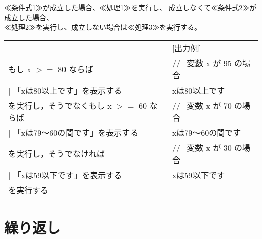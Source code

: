 \documentclass[11pt,a4j]{jarticle}
\begin{document}
≪条件式1≫が成立した場合、≪処理1≫を実行し、
成立しなくて≪条件式2≫が成立した場合、\\
≪処理2≫を実行し、成立しない場合は≪処理3≫を実行する。

\begin{table}[!h]
\hspace{1cm}
\begin{tabular}{l l}
\noindent [使用例] & \hspace{1cm} [出力例] \\
\hspace{1cm} \noindent もし x $>=$ 80 ならば & 
\hspace{2cm} // \ 変数 x が 95 の場合 \\
\hspace{1cm}   \hspace{1zw} $|$ \hspace{1zw}  「xは80以上です」を表示する & 
\hspace{2cm} xは80以上です \\
\hspace{1cm} を実行し，そうでなくもし x $>=$ 60 ならば & 
\hspace{2cm} // \ 変数 x が 70 の場合 \\
\hspace{1cm}   \hspace{1zw} $|$ \hspace{1zw}  「xは79〜60の間です」を表示する & 
\hspace{2cm} xは79〜60の間です \\
\hspace{1cm} を実行し，そうでなければ & 
\hspace{2cm} // \ 変数 x が 30 の場合 \\
\hspace{1cm}   \hspace{1zw} $|$ \hspace{1zw}  「xは59以下です」を表示する & 
\hspace{2cm} xは59以下です \\
\hspace{1cm} を実行する & 
\hspace{2cm} \\
\end{tabular}
\end{table}

\vspace{-5mm}
\section{繰り返し}
\end{document}
